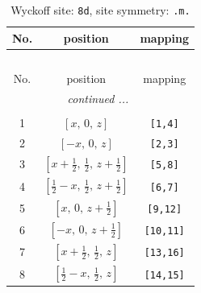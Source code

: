 \documentclass[fleqn,8pt]{jsarticle}
\begin{document}
\begin{longtable}{ccc}
\caption{Wyckoff site: {\tt 8d}, site symmetry: {\tt .m.}}
 \\
 \hline \hline
No. & position & mapping \\ \hline \endfirsthead

\multicolumn{2}{l}{\tablename\ \thetable{}} \\
 \hline \hline
No. & position & mapping \\ \hline \endhead

 \hline \hline
\multicolumn{2}{r}{\footnotesize\it continued ...} \\ \endfoot

 \hline \hline
\multicolumn{2}{r}{} \\ \endlastfoot

1 & $\left[ x,\, 0,\, z \right]$ & {\tt [1,4]} \\ \hline
2 & $\left[ - x,\, 0,\, z \right]$ & {\tt [2,3]} \\ \hline
3 & $\left[ x + \frac{1}{2},\, \frac{1}{2},\, z + \frac{1}{2} \right]$ & {\tt [5,8]} \\ \hline
4 & $\left[ \frac{1}{2} - x,\, \frac{1}{2},\, z + \frac{1}{2} \right]$ & {\tt [6,7]} \\ \hline
5 & $\left[ x,\, 0,\, z + \frac{1}{2} \right]$ & {\tt [9,12]} \\ \hline
6 & $\left[ - x,\, 0,\, z + \frac{1}{2} \right]$ & {\tt [10,11]} \\ \hline
7 & $\left[ x + \frac{1}{2},\, \frac{1}{2},\, z \right]$ & {\tt [13,16]} \\ \hline
8 & $\left[ \frac{1}{2} - x,\, \frac{1}{2},\, z \right]$ & {\tt [14,15]} \\
\end{longtable}
\renewcommand{\arraystretch}{1.2}
\end{document}
